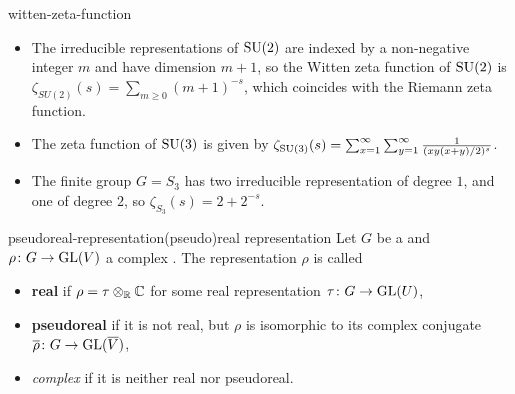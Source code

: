 \begin{example}{witten-zeta-function}
    \begin{itemize}
        \item The irreducible representations of $\textup{SU}(2)$ are indexed by a non-negative integer $m$ and have dimension $m + 1$, so the Witten zeta function of $\textup{SU}(2)$ is $\zeta_{SU(2)}(s) = \sum_{m \ge 0} (m + 1)^{-s}$, which coincides with the Riemann zeta function.
        \item The zeta function of $\textup{SU}(3)$ is given by $\zeta_{\textup{SU}(3)}(s) = \sum_{x = 1}^{\infty} \sum_{y = 1}^{\infty} \frac{1}{(xy(x + y) / 2)^s}$.
        \item The finite group $G = S_3$ has two irreducible representation of degree $1$, and one of degree $2$, so $\zeta_{S_3}(s) = 2 + 2^{-s}$.
    \end{itemize}
\end{example}

\begin{topic}{pseudoreal-representation}{(pseudo)real representation}
    Let $G$ be a  and $\rho \colon G \to \textup{GL}(V)$ a complex . The representation $\rho$ is called
    \begin{itemize}
        \item \textbf{real} if $\rho = \tau \otimes_{\mathbb{R}} \mathbb{C}$ for some real representation $\tau \colon G \to \textup{GL}(U)$,
        \item \textbf{pseudoreal} if it is not real, but $\rho$ is isomorphic to its complex conjugate $\overline{\rho} \colon G \to \textup{GL}(\overline{V})$,
        \item \textit{complex} if it is neither real nor pseudoreal.
    \end{itemize}
\end{topic}

